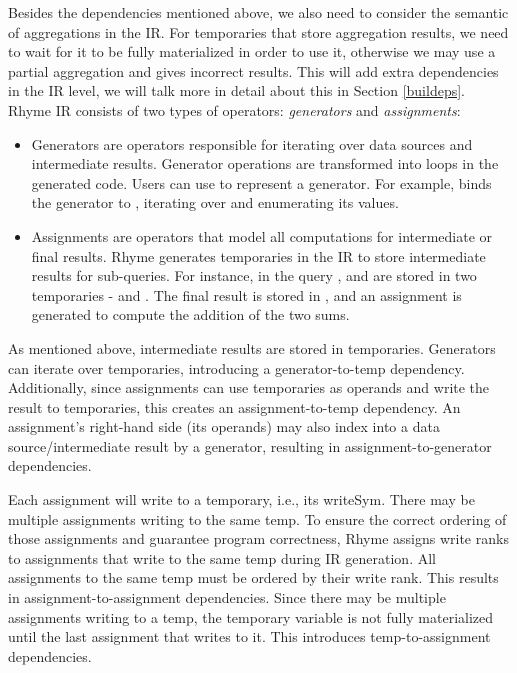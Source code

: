 \documentclass[sigplan, nonacm]{acmart}\settopmatter{printfolios=true,printccs=false,printacmref=false}
\begin{document}
Besides the dependencies mentioned above, we also need to consider the semantic of aggregations in the IR. For temporaries that store aggregation results, we need to wait for it to be fully materialized in order to use it, otherwise we may use a partial aggregation and gives incorrect results. This will add extra dependencies in the IR level, we will talk more in detail about this in Section \ref{buildeps}.
\fi
Rhyme IR consists of two types of operators: \textit{generators} and \textit{assignments}:\begin{itemize}
  \item Generators are operators responsible for iterating over data sources and intermediate results. Generator operations are transformed into loops in the generated code. Users can use \inline{*} to represent a generator. For example,  binds the generator \inline{*} to , iterating over  and enumerating its values.

  \item Assignments are operators that model all computations for intermediate or final results. Rhyme generates temporaries in the IR to store intermediate results for sub-queries. For instance, in the query ,  and  are stored in two temporaries -  and . The final result is stored in , and an assignment  is generated to compute the addition of the two sums.
\end{itemize}
As mentioned above, intermediate results are stored in temporaries. Generators can iterate over temporaries, introducing a generator-to-temp dependency. Additionally, since assignments can use temporaries as operands and write the result to temporaries, this creates an assignment-to-temp dependency. An assignment's right-hand side (its operands) may also index into a data source/intermediate result by a generator, resulting in assignment-to-generator dependencies.\par

Each assignment will write to a temporary, i.e., its writeSym. There may be multiple assignments writing to the same temp. To ensure the correct ordering of those assignments and guarantee program correctness, Rhyme assigns write ranks to assignments that write to the same temp during IR generation. All assignments to the same temp must be ordered by their write rank. This results in assignment-to-assignment dependencies. Since there may be multiple assignments writing to a temp, the temporary variable is not fully materialized until the last assignment that writes to it. This introduces temp-to-assignment dependencies.\par
\end{document}
